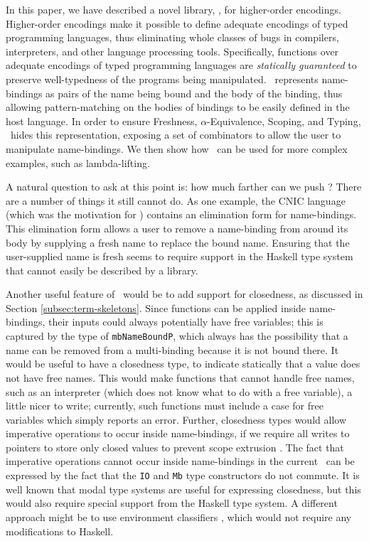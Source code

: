 \documentclass[natbib]{sigplanconf}
\begin{document}
In this paper, we have described a novel library, \ourlib, for
higher-order encodings. Higher-order encodings make it possible to
define adequate encodings of typed programming languages, thus
eliminating whole classes of bugs in compilers, interpreters, and
other language processing tools. Specifically, functions over adequate
encodings of typed programming languages are \emph{statically
  guaranteed} to preserve well-typedness of the programs being
manipulated. \ourlib\ represents name-bindings as pairs of the name
being bound and the body of the binding, thus allowing
pattern-matching on the bodies of bindings to be easily defined in the
host language. In order to ensure Freshness, $\alpha$-Equivalence,
Scoping, and Typing, \ourlib\ hides this representation, exposing a
set of combinators to allow the user to manipulate name-bindings.
We then show how \ourlib\ can be used for more complex examples,
such as lambda-lifting.


A natural question to ask at this point is: how much farther can we
push \ourlib? There are a number of things it still cannot do. As one
example, the CNIC language (which was the motivation for \ourlib)
contains an elimination form for name-bindings.  This elimination form
allows a user to remove a name-binding from around its body by
supplying a fresh name to replace the bound name. Ensuring that the
user-supplied name is fresh seems to require support in the Haskell
type system that cannot easily be described by a library.


Another useful feature of \ourlib\ would be to add support for
closedness, as discussed in Section \ref{subsec:term-skeletons}.
Since functions can be applied inside name-bindings, their inputs
could always potentially have free variables; this is captured by the
type of \lstinline{mbNameBoundP}, which always has the possibility
that a name can be removed from a multi-binding because it is not
bound there. It would be useful to have a closedness type, to indicate
statically that a value does not have free names.  This would make
functions that cannot handle free names, such as an interpreter (which
does not know what to do with a free variable), a little nicer to
write; currently, such functions must include a case for free
variables which simply reports an error.  Further, closedness types
would allow imperative operations to occur inside name-bindings, if we
require all writes to pointers to store only closed values to prevent
scope extrusion \cite{calcagno00}.  The fact that imperative
operations cannot occur inside name-bindings in the current \ourlib\
can be expressed by the fact that the \lstinline{IO} and
\lstinline{Mb} type constructors do not commute. It is well known that
modal type systems are useful for expressing closedness, but this
would also require special support from the Haskell type system. A
different approach might be to use environment classifiers
\cite{taha03}, which would not require any modifications to Haskell.
\end{document}
